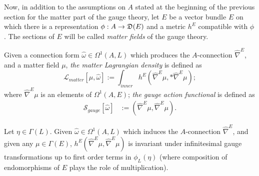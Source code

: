 Now, in addition to the assumptions on $A$ stated at the beginning of the previous section for the matter part of the gauge theory, let $E$ be a vector bundle $E$ on which there is a representation $\phi: A \to \alg D(E)$ and a metric $h^E$ compatible with $\phi$. The sections of $E$ will be called \emph{matter fields} of the gauge theory.

\begin{definition}\label{definitionMatterActionLagrangian}
Given a connection form $\hat \omega \in \Omega^1(A, L)$ which produces the $A$-connection $\hat \nabla^E$, and a matter field $\mu$, \emph{the matter Lagrangian density} is defined as
\begin{equation}
    \mathcal L_{matter}[\mu, \hat \omega] := \int_{inner} h^E(\hat \nabla^E \mu, *\hat \nabla^E \mu);
\end{equation}
where $\hat \nabla^E \mu$ is an elements of $\Omega^1(A,E)$; \emph{the gauge action functional} is defined as 
\begin{align}
    \mathcal S_{gauge}[\hat \omega]& := (\hat \nabla^E \mu, \hat \nabla^E \mu).
\end{align}
\end{definition}

\begin{lemma}
Let $\eta \in \Gamma(L)$. Given $\hat \omega \in \Omega^1(A, L)$ which induces the $A$-connection $\hat \nabla^E$, and given any $\mu \in \Gamma(E)$, $h^E(\hat \nabla^E \mu, \hat \nabla^E \mu)$ is invariant under infinitesimal gauge transformations up to first order terms in $\phi_L(\eta)$ (where composition of endomorphisms of $E$ plays the role of multiplication).
\end{lemma}

